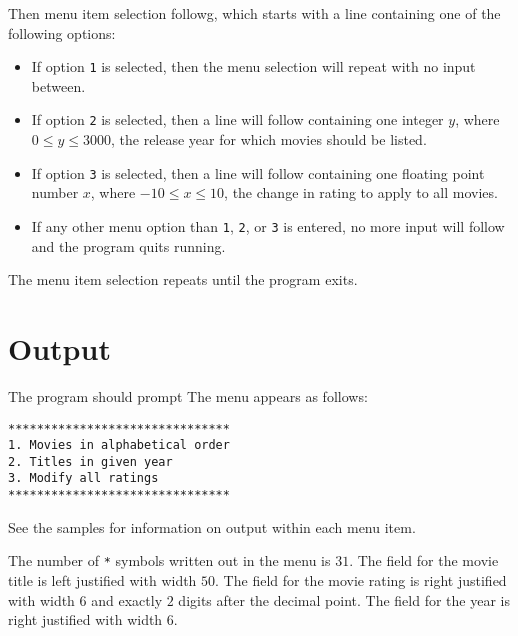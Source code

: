 Then menu item selection followg, which starts with a line containing one of the following options:
\begin{itemize}
    \item If option \texttt{1} is selected, then the menu selection will repeat with no input between.
    \item If option \texttt{2} is selected, then a line will follow containing one integer $y$, where $0 \leq y \leq 3000$, the release year for which movies should be listed.
    \item If option \texttt{3} is selected, then a line will follow containing one floating point number $x$, where $-10 \leq x \leq 10$, the change in rating to apply to all movies.
    \item If any other menu option than \texttt{1}, \texttt{2}, or \texttt{3} is entered, no more input will follow and the program quits running.
\end{itemize}

The menu item selection repeats until the program exits.

\section*{Output}
The program should prompt 
The menu appears as follows:
\begin{verbatim}
*******************************
1. Movies in alphabetical order
2. Titles in given year
3. Modify all ratings
*******************************
\end{verbatim}

See the samples for information on output within each menu item.

The number of \texttt{*} symbols written out in the menu is $31$.
The field for the movie title is left justified with width $50$.
The field for the movie rating is right justified with width $6$ and exactly $2$ digits after the decimal point.
The field for the year is right justified with width $6$.
